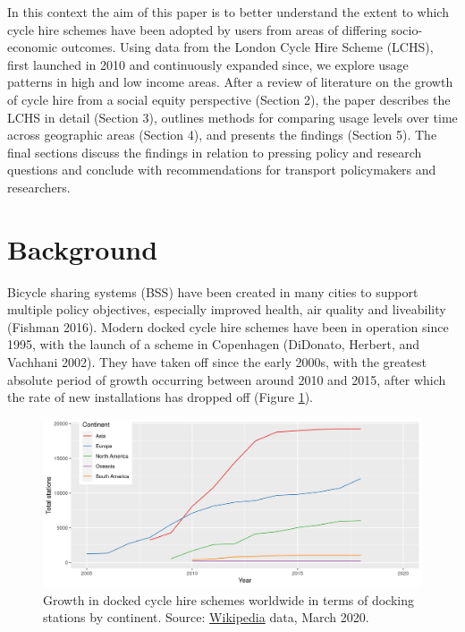 \documentclass[
]{article}
\begin{document}
In this context the aim of this paper is to better understand the extent to which cycle hire schemes have been adopted by users from areas of differing socio-economic outcomes.
Using data from the London Cycle Hire Scheme (LCHS), first launched in 2010 and continuously expanded since, we explore usage patterns in high and low income areas.
After a review of literature on the growth of cycle hire from a social equity perspective (Section 2), the paper describes the LCHS in detail (Section 3), outlines methods for comparing usage levels over time across geographic areas (Section 4), and presents the findings (Section 5).
The final sections discuss the findings in relation to pressing policy and research questions and conclude with recommendations for transport policymakers and researchers.

\hypertarget{background}{%
\section{Background}\label{background}}

Bicycle sharing systems (BSS) have been created in many cities to support multiple policy objectives, especially improved health, air quality and liveability (Fishman 2016).
Modern docked cycle hire schemes have been in operation since 1995, with the launch of a scheme in Copenhagen (DiDonato, Herbert, and Vachhani 2002).
They have taken off since the early 2000s, with the greatest absolute period of growth occurring between around 2010 and 2015, after which the rate of new installations has dropped off (Figure \ref{fig:global-growth}).



\begin{figure}[h]

{\centering \includegraphics[width=0.8\linewidth]{figures/bikehshare-global-stations-growth} 

}

\caption{Growth in docked cycle hire schemes worldwide in terms of docking stations by continent. Source: \href{https://en.wikipedia.org/wiki/List_of_bicycle-sharing_systems}{Wikipedia} data, March 2020.}\label{fig:global-growth}
\end{figure}
\end{document}

